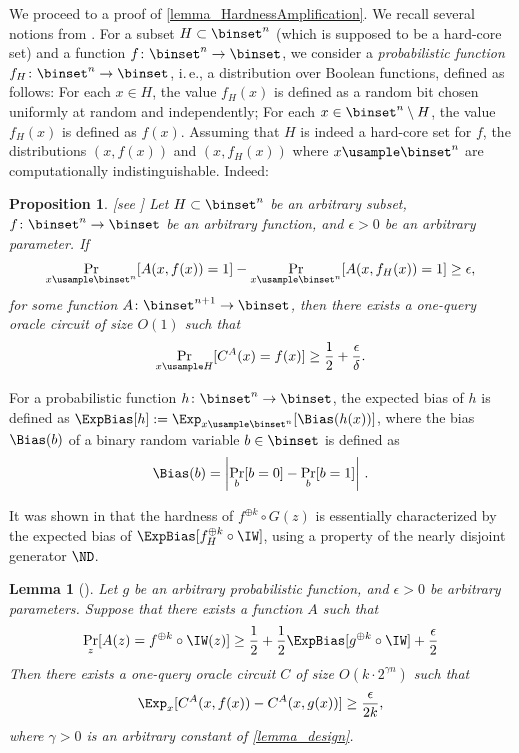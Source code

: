 \documentclass[11pt]{article}
\numberwithin{equation}{section}
\newtheorem{lemma}[theorem]{Lemma}
\newtheorem{proposition}[theorem]{Proposition}
\theoremstyle{definition}
\theoremstyle{plain}
\newcommand{\ie}{i.\,e.}
\begin{document}
We proceed to a proof of \cref{lemma_HardnessAmplification}.
%
%
We recall  %
several notions from \cite{HealyVV06_siamcomp_journals}.
For a subset $H \subset \binset^n$ (which is supposed to be a hard-core set) and a function $f \colon \binset^n \to \binset$,
we consider a \emph{probabilistic function} $f_H \colon \binset^n \to \binset$, \ie, a distribution over %
Boolean functions,  %
defined as follows:
For each $x \in H$, the value $f_H(x)$ is defined as a random bit chosen uniformly at random and independently;
For each $x \in \binset^n \setminus H$, the value $f_H(x)$ is defined as $f(x)$.
Assuming that $H$ is indeed a hard-core set for $f$, the distributions $(x, f(x))$ and $(x, f_H(x))$ where $x \usample \binset^n$ are computationally indistinguishable. Indeed:
\begin{proposition}
  [see \cite{Trevisa03_focs_conf}]  %
  \label{prop_HardcoreAndProbabilisticFunction}
  Let $H \subset \binset^n$ be an arbitrary subset, $f \colon \binset^n \to \binset$ be an arbitrary function, and $\epsilon > 0$ be an arbitrary parameter.
  If
  \begin{align*}
    \Pr_{x \usample \binset^n}[ A(x, f(x)) = 1 ] - \Pr_{x \usample \binset^n}[ A(x, f_H(x)) = 1 ] \ge \epsilon,
  \end{align*}
  for some function $A \colon \binset^{n + 1} \to \binset$,
  then
  there exists a one-query oracle circuit of size $O(1)$ such that
  \begin{align*}
    \Pr_{x \usample H} [ C^A(x) = f(x) ] \ge \frac{1}{2} + \frac{\epsilon} {\delta}.
  \end{align*}
\end{proposition}

%
%
For a probabilistic function $h \colon \binset^n \to \binset$,
the expected bias of $h$ is defined as $\ExpBias[h] := \Exp_{x \usample \binset^n} [ \Bias(h(x)) ]$,
%
%
%
%
%
where the bias $\Bias(b)$ of a binary random variable $b \in \binset$ is defined as
\[ \Bias(b) = \left| \Pr_b[b = 0] - \Pr_b[b = 1] \right| \,. \]

It was shown in \cite{HealyVV06_siamcomp_journals} that the hardness of $f^{\oplus k} \circ G(z)$ is essentially characterized
by the expected bias of $\ExpBias[ f_H^{\oplus k} \circ \IW ]$,
%
%
using a property of the nearly disjoint generator $\ND$.
\begin{lemma}
  [{\cite[Lemma 5.2 and Lemma 5.12]{HealyVV06_siamcomp_journals}}]
  \label{lemma_ExpectedBiasCharacterization}
  Let $g$ be an arbitrary probabilistic function, and $\epsilon> 0$ be arbitrary parameters.
  Suppose that there exists a function $A$ such that
  $$
    \Pr_z [ A(z) = f^{\oplus k} \circ \IW (z) ] \ge \frac{1}{2} + \frac{1}{2} \ExpBias[ g^{\oplus k} \circ \IW ] + \frac{\epsilon}{2}
  $$
  Then there exists a one-query oracle circuit $C$ of size $O(k \cdot 2^{\gamma n})$ such that
  $$
    \Exp_x [ C^A(x, f(x)) - C^A(x, g(x)) ] \ge \frac{\epsilon}{ 2k},
  $$
  where $\gamma > 0$ is an arbitrary constant of \cref{lemma_design}.
\end{lemma}
\end{document}
